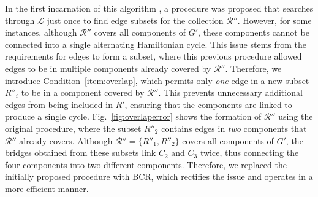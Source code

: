 \documentclass[a4paper,11pt,authoryear]{elsarticle}
\begin{document}
\noindent In the first incarnation of this algorithm \citep{becker2010}, a procedure was proposed that searches through $\mathcal{L}$ just once to find edge subsets for the collection $\mathcal{R}''$. However, for some instances, although $\mathcal{R}''$ covers all components of $G'$, these components cannot be connected into a single alternating Hamiltonian cycle. This issue stems from the requirements for edges to form a subset, where this previous procedure allowed edges to be in multiple components already covered by $\mathcal{R}''$. Therefore, we introduce Condition~\ref{item:overlap}, which permits only \emph{one} edge in a new subset $R''_i$ to be in a component covered by $\mathcal{R}''$. This prevents unnecessary additional edges from being included in $R'$, ensuring that the components are linked to produce a single cycle. Fig.~\ref{fig:overlaperror} shows the formation of $\mathcal{R}''$ using the original procedure, where the subset $R''_2$ contains edges in \emph{two} components that $\mathcal{R}''$ already covers. Although $\mathcal{R}'' = \{R''_1, R''_2\}$ covers all components of $G'$, the bridges obtained from these subsets link $C_2$ and $C_3$ twice, thus connecting the four components into two different components. Therefore, we replaced the initially proposed procedure with BCR, which rectifies the issue and operates in a more efficient manner.

\end{document}
